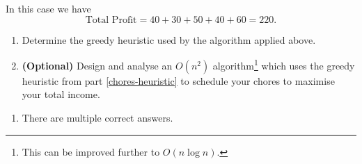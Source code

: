 \documentclass[12pt]{article}
\begin{document}
\begin{question}
In this case we have
$$
    \text{Total Profit} = 40 + 30 + 50 + 40 + 60 = 220.
$$

\begin{enumerate}
    \item \label{chores-heuristic} Determine the greedy heuristic used by the algorithm applied above.
    \item \label{chores-algorithm} \textbf{(Optional)} Design and analyse an \(O(n^2)\) algorithm\footnote{This can be improved further to \(O(n\log n)\).} which uses the greedy heuristic from part \ref{chores-heuristic} to schedule your chores to maximise your total income.
\end{enumerate}

\end{question}
\begin{rubric}
\begin{enumerate}
    \item There are multiple correct answers.
    
\end{enumerate}
\end{rubric}
\newpage
\begin{solution}
\end{solution}
\begin{attribution}
\end{attribution}
\end{document}
